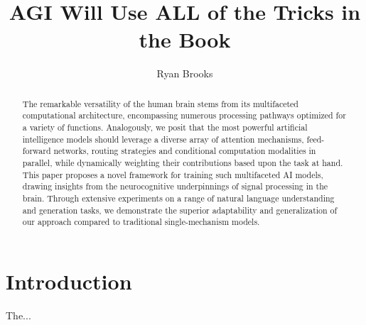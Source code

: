 \documentclass{article}
\begin{document}
\title{AGI Will Use ALL of the Tricks in the Book}
\author{Ryan Brooks}
\date{}

\maketitle

\begin{abstract}
    The remarkable versatility of the human brain stems from its multifaceted computational architecture, encompassing numerous processing pathways optimized for a variety of functions. Analogously, we posit that the most powerful artificial intelligence models should leverage a diverse array of attention mechanisms, feed-forward networks, routing strategies and conditional computation modalities in parallel, while dynamically weighting their contributions based upon the task at hand. This paper proposes a novel framework for training such multifaceted AI models, drawing insights from the neurocognitive underpinnings of signal processing in the brain. Through extensive experiments on a range of natural language understanding and generation tasks, we demonstrate the superior adaptability and generalization of our approach compared to traditional single-mechanism models.
\end{abstract}

\section{Introduction}
The...
\end{document}
